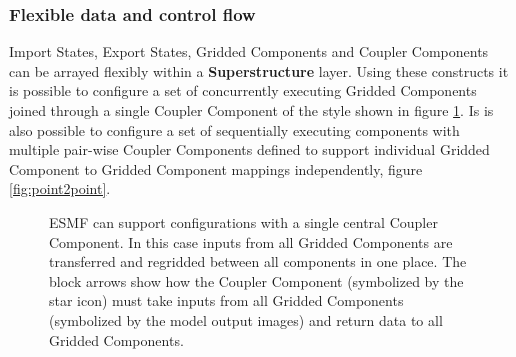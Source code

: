 \subsubsection{Flexible data and control flow}
Import States, Export States, Gridded Components and Coupler Components can be arrayed flexibly
within a {\bf Superstructure} layer. Using these constructs it is possible to configure a set of concurrently
executing Gridded Components joined through a single Coupler Component of the style shown in figure 
\ref{fig:hubspoke}. Is is also possible to configure a set of sequentially executing components with multiple
pair-wise Coupler Components defined to support individual Gridded Component to Gridded 
Component mappings independently, figure \ref{fig:point2point}.

\begin{figure}
\caption{ESMF can support configurations with a single central Coupler Component. In this case inputs from all Gridded 
Components are transferred and regridded between all components in one place. The block arrows show how the 
Coupler Component 
(symbolized by the star icon) must take inputs from all Gridded Components (symbolized by the model output images) 
and return data to all Gridded Components.}
\label{fig:hubspoke}
\end{figure}

